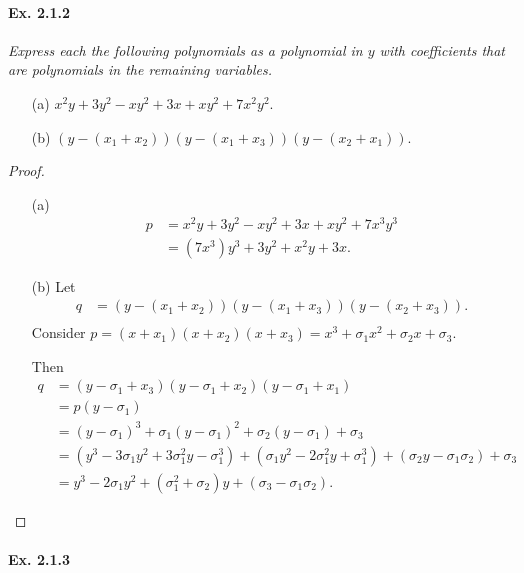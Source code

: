 \documentclass[11pt,a4paper]{article}
\begin{document}
\paragraph{Ex. 2.1.2}

{\it Express each the following polynomials as a polynomial in $y$ with coefficients that are polynomials in the remaining variables.
\begin{enumerate}
\item[(a)] $x^2y + 3y^2 -xy^2 + 3x +xy^2 +7x^2y^2$.
\item[(b)] $(y-(x_1+x_2))(y-(x_1+x_3))(y-(x_2+x_1))$.
\end{enumerate}
}

\begin{proof}
\begin{enumerate}
\item[(a)] 
\begin{align*}
p &= x^2 y + 3 y^2 - x y^2 + 3x + x y^2 + 7 x^3 y^3\\
&= ( 7 x^3) y^3 + 3 y^2 + x^2 y + 3x.
\end{align*}

\item[(b)] 
Let 
\begin{align*}
q &= (y -(x_1+x_2))(y-(x_1+x_3))(y-(x_2+x_3)).\\
\end{align*}
Consider $p = (x+x_1)(x+x_2)(x+x_3) = x^3+ \sigma_1x^2+\sigma_2 x +\sigma_3$.

Then
\begin{align*}
q &= (y - \sigma_1 + x_3)(y-\sigma_1+x_2)(y - \sigma_1 + x_1)\\
&=p(y-\sigma_1)\\
&=(y-\sigma_1)^3 + \sigma_1 (y-\sigma_1)^2 + \sigma_2(y-\sigma_1) + \sigma_3\\
&=(y^3 -3 \sigma_1 y^2 + 3 \sigma_1^2 y - \sigma_1^3) + (\sigma_1y^2 - 2 \sigma_1^2y + \sigma_1^3)+ (\sigma_2 y - \sigma_1 \sigma_2) + \sigma_3\\
&=y^3 - 2 \sigma_1 y^2 + (\sigma_1^2+\sigma_2)y + (\sigma_3 - \sigma_1\sigma_2).
\end{align*}
\end{enumerate}
\end{proof}

\paragraph{Ex. 2.1.3}
\end{document}
